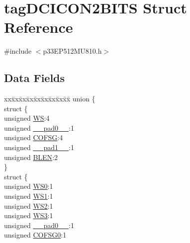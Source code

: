 \hypertarget{structtag_d_c_i_c_o_n2_b_i_t_s}{}\section{tag\+D\+C\+I\+C\+O\+N2\+B\+I\+TS Struct Reference}
\label{structtag_d_c_i_c_o_n2_b_i_t_s}


{\ttfamily \#include $<$p33\+E\+P512\+M\+U810.\+h$>$}

\subsection*{Data Fields}
\begin{DoxyCompactItemize}
\item 
\begin{tabbing}
xx\=xx\=xx\=xx\=xx\=xx\=xx\=xx\=xx\=\kill
union \{\\
\>struct \{\\
\>\>unsigned \hyperlink{structtag_d_c_i_c_o_n2_b_i_t_s_a9dd900e1bdb8ea7978ef4cd00916a0eb}{WS}:4\\
\>\>unsigned \hyperlink{structtag_d_c_i_c_o_n2_b_i_t_s_adf71f3d8410c1f1dbbc96680a92c49af}{\_\_pad0\_\_}:1\\
\>\>unsigned \hyperlink{structtag_d_c_i_c_o_n2_b_i_t_s_a0e6b4f559ff7bd7810f1e0cef97b5fbd}{COFSG}:4\\
\>\>unsigned \hyperlink{structtag_d_c_i_c_o_n2_b_i_t_s_acaf2d0924a107ec6e8d2e31febaf66f9}{\_\_pad1\_\_}:1\\
\>\>unsigned \hyperlink{structtag_d_c_i_c_o_n2_b_i_t_s_a02a80b933d8e88d052868950866bd4f3}{BLEN}:2\\
\>\} \\
\>struct \{\\
\>\>unsigned \hyperlink{structtag_d_c_i_c_o_n2_b_i_t_s_a0c9ac3534170fbfb00e18b623e03628c}{WS0}:1\\
\>\>unsigned \hyperlink{structtag_d_c_i_c_o_n2_b_i_t_s_a4e9b6e67441841dc3baf880137ab3882}{WS1}:1\\
\>\>unsigned \hyperlink{structtag_d_c_i_c_o_n2_b_i_t_s_a1ac2af7b72caf560f4b0d404d624c3a8}{WS2}:1\\
\>\>unsigned \hyperlink{structtag_d_c_i_c_o_n2_b_i_t_s_a9ec45d9b0a5aa8951b56ddbc90f49656}{WS3}:1\\
\>\>unsigned \hyperlink{structtag_d_c_i_c_o_n2_b_i_t_s_adf71f3d8410c1f1dbbc96680a92c49af}{\_\_pad0\_\_}:1\\
\>\>unsigned \hyperlink{structtag_d_c_i_c_o_n2_b_i_t_s_ac729a121e9ae40e261367096d720cfef}{COFSG0}:1\\

\end{tabbing}
\end{DoxyCompactItemize}

